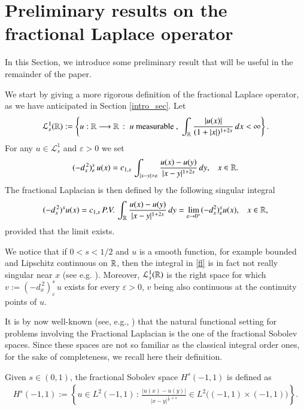 \section{Preliminary results on the fractional Laplace operator}\label{theor_sec}

In this Section, we introduce some preliminary result that will be useful in the remainder of the paper.


We start by giving a more rigorous definition of the fractional Laplace operator, as we have anticipated in Section \ref{intro_sec}. Let
\begin{align*}
	\mathcal L^1_s(\mathbb{R}) :=\left\{ u:\mathbb{R}\longrightarrow\mathbb{R}\,:\; u\textrm{ measurable },\;\int_{\mathbb{R}}\frac{|u(x)|}{(1+|x|)^{1+2s}}\,dx<\infty\right\}.
\end{align*}
For any $u\in\mathcal L_s^1$ and $\varepsilon>0$ we set 
\begin{align*}
	(-d_x^{\,2})^s_{\varepsilon}\, u(x) = \ccs\,\int_{|x-y|>\varepsilon}\frac{u(x)-u(y)}{|x-y|^{1+2s}}\,dy,\;\;\; x\in\RR.
\end{align*}
The fractional Laplacian is then defined by the following singular integral
\begin{align}\label{fl}
	(-d_x^{\,2})^{s}u(x) = c_{1,s}\,P.V.\,\int_{\mathbb{R}}\frac{u(x)-u(y)}{|x-y|^{1+2s}}\,dy = \lim_{\varepsilon\to 0^+} (-d_x^2)^s_{\varepsilon} u(x), \;\;\; x\in\mathbb{R},
\end{align}
provided that the limit exists. 

We notice that if $0<s<1/2$ and $u$ is a smooth function, for example bounded and Lipschitz continuous on $\mathbb{R}$, then the integral in \eqref{fl} is in fact not really singular near $x$ (see e.g. \cite[Remark 3.1]{dihitchhiker}). Moreover, $\mathcal L_s^1(\mathbb{R})$ is the right space for which $v:= (-d_x^{\,2})^s_{\varepsilon}\, u$ exists for every $\varepsilon > 0$, $v$ being also continuous at the continuity points of $u$.

It is by now well-known (see, e.g., \cite{dihitchhiker}) that the natural functional setting for problems involving the Fractional Laplacian is the one of the fractional Sobolev spaces. Since these spaces are not so familiar as the classical integral order ones, for the sake of completeness, we recall here their definition. 

Given $s\in(0,1)$, the fractional Sobolev space $H^s(-1,1)$ is defined as
\begin{align*}
	H^s(-1,1):= \left\{u\in L^2(-1,1)\,:\, \frac{|u(x)-u(y)|}{|x-y|^{\frac 12+s}}\in L^2\Big((-1,1)\times(-1,1)\Big) \right\}.
\end{align*}

